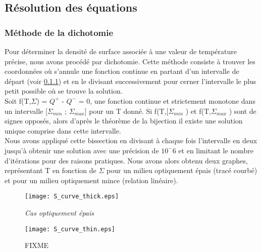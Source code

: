 \subsection{Résolution des équations}
\subsubsection{Méthode de la dichotomie}

Pour déterminer la densité de surface associée à une valeur de température précise, nous avons procédé par dichotomie.
Cette méthode consiste à trouver les coordonnées où s'annule une fonction continue en partant d'un intervalle de départ (voir \ref{}) et en le divisant successivement pour cerner l'intervalle le plus petit possible où se trouve la solution.  
\\
Soit f(T,$\Sigma$) = $Q^+$ - $Q^-$ = 0,  une fonction continue et strictement monotone dans un intervalle [$\Sigma_{min}$ ; $\Sigma_{max}$] pour un T donné. Si f(T,[$\Sigma_{min}$ ) et  f(T,$\Sigma_{max}$ ) sont de signes opposés, alors d'après le théorème de la bijection il existe une solution unique comprise dans cette intervalle. 
\\
Nous avons appliqué cette bissection en divisant à chaque fois l'intervalle en deux jusqu'à obtenir une solution avec une précision de $10^-6$ et en limitant le nombre d'itérations pour des raisons pratiques. Nous avons alors obtenu deux graphes, représentant T en fonction de $\Sigma$ pour un milieu optiquement épais (tracé courbé) et pour un milieu optiquement mince (relation linéaire).
\\

\begin{figure}
\centering
\begin{minipage}{.5\textwidth}
  \centering
  \texttt{[image: S\_curve\_thick.eps]}
  \caption{\textit{Cas optiquement épais}}
  \label{fig:test1}
\end{minipage}%
\begin{minipage}{.5\textwidth}
  \centering
  \texttt{[image: S\_curve\_thin.eps]}
  \caption{FIXME}
  \label{fig:test2}
\end{minipage}
\end{figure}

